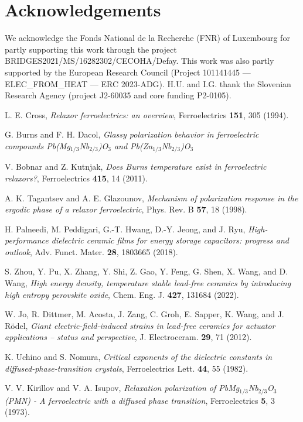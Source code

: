 \documentclass[%
 preprint, %
 amsmath,amssymb,
 aps, physrev,
]{revtex4-2}
\begin{document}
\section*{Acknowledgements}
We acknowledge the Fonds National de la Recherche (FNR) of Luxembourg for partly supporting this work through the project BRIDGES2021/MS/16282302/CECOHA/Defay. This work was also partly supported by the European Research Council (Project 101141445 — ELEC\_FROM\_HEAT — ERC 2023-ADG). H.U. and I.G. thank the Slovenian Research Agency (project J2-60035 and core funding P2-0105).

\begin{thebibliography}{99}

 L. E. Cross, {\it Relaxor ferroelectrics: an overview}, Ferroelectrics {\bf 151}, 305 (1994).

 G. Burns and F. H. Dacol, {\it Glassy polarization behavior in ferroelectric compounds Pb(Mg$_{1/3}$Nb$_{2/3}$)O$_{3}$ and Pb(Zn$_{1/3}$Nb$_{2/3}$)O$_{3}$}

 V. Bobnar and Z. Kutnjak, {\it Does Burns temperature exist in ferroelectric relaxors?}, Ferroelectrics {\bf 415}, 14 (2011).

 A. K. Tagantsev and A. E. Glazounov, {\it Mechanism of polarization response in the ergodic phase of a relaxor ferroelectric}, Phys. Rev. B {\bf 57}, 18 (1998).

 H. Palneedi, M. Peddigari, G.-T. Hwang, D.-Y. Jeong, and J. Ryu, {\it High-performance dielectric ceramic films for energy storage capacitors: progress and outlook}, Adv. Funct. Mater. {\bf 28}, 1803665 (2018).

 S. Zhou, Y. Pu, X. Zhang, Y. Shi, Z. Gao, Y. Feng, G. Shen, X. Wang, and D. Wang, {\it High energy density, temperature stable lead-free ceramics by introducing high entropy perovskite oxide}, Chem. Eng. J. {\bf 427}, 131684 (2022).

 W. Jo, R. Dittmer, M. Acosta, J. Zang, C. Groh, E. Sapper, K. Wang, and J. Rödel, {\it Giant electric-field-induced strains in lead-free ceramics for actuator applications – status and perspective}, J. Electroceram. {\bf 29}, 71 (2012).

 K. Uchino and S. Nomura, {\it Critical exponents of the dielectric constants in diffused-phase-transition crystals}, Ferroelectrics Lett. {\bf 44}, 55 (1982).

 V. V. Kirillov and V. A. Isupov, {\it Relaxation polarization of PbMg$_{1/3}$Nb$_{2/3}$O$_3$ (PMN) - A ferroelectric with a diffused phase transition}, Ferroelectrics {\bf 5}, 3 (1973).


\end{thebibliography}
\end{document}

